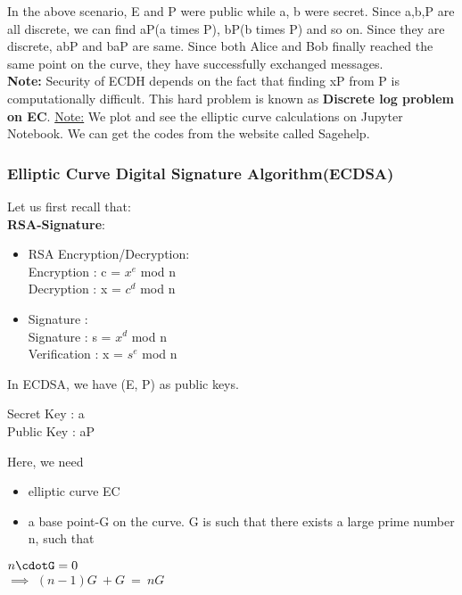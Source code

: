 \documentclass[11pt]{article}
\begin{document}
In the above scenario, E and P were public while a, b were secret. Since a,b,P are all discrete, we can find aP(a times P), bP(b times P) and so on. Since they are discrete, abP and baP are same. Since both Alice and Bob finally reached the same point on the curve, they have successfully exchanged messages.\\
\textbf{Note:} Security of ECDH depends on the fact that finding xP from P is computationally difficult. This hard problem is known as \textbf{Discrete log problem on EC}.
\underline{Note:} We plot and see the elliptic curve calculations on Jupyter Notebook. We can get the codes from the website called Sagehelp.
\subsubsection{Elliptic Curve Digital Signature Algorithm(ECDSA)}
Let us first recall that:\\
\textbf{RSA-Signature}:\\
\begin{itemize}
    \item RSA Encryption/Decryption:\\
    Encryption : c = $x^e$ mod n\\
    Decryption : x = $c^d$ mod n\\

    \item Signature :\\
    Signature : s = $x^d$ mod n\\
    Verification : x = $s^e$ mod n\\
\end{itemize}
In ECDSA, we have (E, P) as public keys.\\
\begin{center}
    Secret Key : a\\
    Public Key : aP\\
\end{center}
Here, we need 
\begin{itemize}
    \item elliptic curve EC
    \item a base point-G on the curve. G is such that there exists a large prime number n, such that
\end{itemize}
\begin{center}
    $n\cdotG = 0$\\
    $\implies$ $(n-1)G\ \boxed{+} G\ =\ nG$\\
\end{center}
\end{document}
